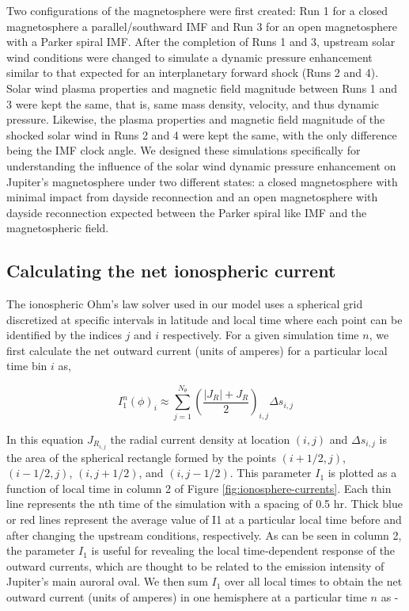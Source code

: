 Two configurations of the magnetosphere were first created: Run 1 for a closed magnetosphere a parallel/southward IMF and Run 3 for an open magnetosphere with a Parker spiral IMF. After the completion of Runs 1 and 3, upstream solar wind conditions were changed to simulate a dynamic pressure enhancement similar to that expected for an interplanetary forward shock (Runs 2 and 4). Solar wind plasma properties and magnetic field magnitude between Runs 1 and 3 were kept the same, that is, same mass density, velocity, and thus dynamic pressure. Likewise, the plasma properties and magnetic field magnitude of the shocked solar wind in Runs 2 and 4 were kept the same, with the only difference being the IMF clock angle. We designed these simulations specifically for understanding the influence of the solar wind dynamic pressure enhancement on Jupiter's magnetosphere under two different states: a closed magnetosphere with minimal impact from dayside reconnection and an open magnetosphere with dayside reconnection expected between the Parker spiral like IMF and the magnetospheric field.

\subsection{Calculating the net ionospheric current}
The ionospheric Ohm's law solver used in our model uses a spherical grid discretized at specific intervals in latitude and local time where each point can be identified by the indices $j$ and $i$ respectively. For a given simulation time $n$, we first calculate the net outward current (units of amperes) for a particular local time bin $i$ as,

\begin{equation}
    I_1^n \left(\phi\right)_i \approx \sum_{j=1}^{N_\theta} \left( \frac{|J_R| + J_R }{2} \right)_{i,j} \Delta s_{i,j}
\end{equation}

In this equation $J_{R_{i,j}}$ the radial current density at location $(i,j)$ and $\Delta s_{i,j}$ is the area of the spherical rectangle formed by the points $(i+1/2,j)$, $(i-1/2,j)$, $(i,j+1/2)$, and $(i,j-1/2)$. This parameter $I_1$ is plotted as a function of local time in column 2 of Figure \ref{fig:ionosphere-currents}. Each thin line represents the nth time of the simulation with a spacing of 0.5 hr. Thick blue or red lines represent the average value of I1 at a particular local time before and after changing the upstream conditions, respectively. As can be seen in column 2, the parameter $I_1$ is useful for revealing the local time‐dependent response of the outward currents, which are thought to be related to the emission intensity of Jupiter's main auroral oval. We then sum $I_1$ over all local times to obtain the net outward current (units of amperes) in one hemisphere at a particular time $n$ as - 

